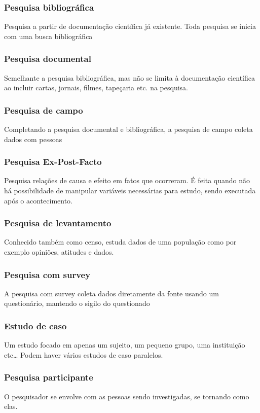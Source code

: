 \subsubsection{Pesquisa bibliográfica}
Pesquisa a partir de documentação científica já existente. Toda pesquisa se inicia com uma busca bibliográfica

\subsubsection{Pesquisa documental}
Semelhante a pesquisa bibliográfica, mas não se limita à documentação científica ao incluir cartas, jornais, filmes, tapeçaria etc. na pesquisa.

\subsubsection{Pesquisa de campo}
Completando a pesquisa documental e bibliográfica, a pesquisa de campo coleta dados com pessoas

\subsubsection{Pesquisa Ex-Post-Facto}
Pesquisa relações de causa e efeito em fatos que ocorreram. É feita quando não há possibilidade de manipular variáveis necessárias para estudo, sendo executada após o acontecimento.

\subsubsection{Pesquisa de levantamento}
Conhecido também como censo, estuda dados de uma população como por exemplo opiniões, atitudes e dados. 

\subsubsection{Pesquisa com survey}
A pesquisa com survey coleta dados diretamente da fonte usando um questionário, mantendo o sigilo do questionado

\subsubsection{Estudo de caso}
Um estudo focado em apenas um sujeito, um pequeno grupo, uma instituição etc… Podem haver vários estudos de caso paralelos.

\subsubsection{Pesquisa participante}
O pesquisador se envolve com as pessoas sendo investigadas, se tornando como elas.

